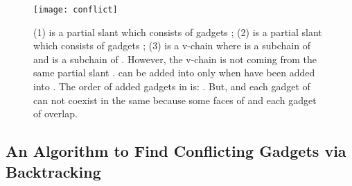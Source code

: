 \documentclass[11pt]{article}
\begin{document}
\begin{figure}[t]
\centering
\texttt{[image: conflict]}
\caption{(1) is a partial slant   which
consists of gadgets ;
(2) is a partial slant   which
consists of gadgets ;
(3)  is a v-chain where
 is a subchain of  and
 is a subchain of .
However, the v-chain is not coming from the same partial slant .
 can be added into  only when  have been
added into .
The order of added gadgets in  is:
.
But,  and each gadget of  can not coexist in the
same  because
some faces of  and each gadget of 
overlap.
}\label{fig:conflict}
\end{figure}


\subsection{An Algorithm to Find Conflicting Gadgets via Backtracking}\label{sec:backtrack-conflict-gadgets}
\end{document}
